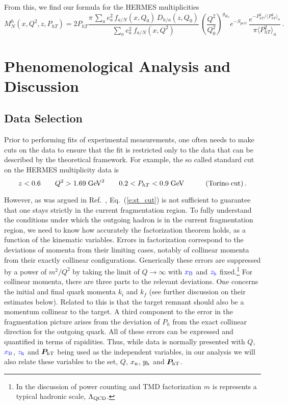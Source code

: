 \documentclass[final,3p,times,onecolumn,sort&compress,hidelinks]{elsarticle}
\newcommand{\xbj}{\ensuremath{{\cbl x_{\rm B}}}}
\newcommand{\xn}{\ensuremath{x_{\rm n}}}
\newcommand{\zh}{\ensuremath{{\cbl z_{\rm h}}}}
\newcommand{\hady}{\ensuremath{y_{\rm h}}}
\newcommand{\T}[2]{\boldsymbol{#1}_{#2\text{T}}}
\newcommand\3[1]{\boldsymbol{#1}}
\newcommand{\crd}{\color{red}}
\newcommand{\cbl}{\color{blue}}
\begin{document}
From this, we find our formula for the HERMES multiplicities~\cite{Airapetian:2012ki} 
\begin{equation}
M_N^h(x, Q^2,z, P_{hT}) =
2P_{hT}\frac{\pi\, \sum_{a} e_a^2 \,f_{a/N}(x, Q_0)\,D_{h/a}(z, Q_0)}
{\sum_{a} e_a^2 \> f_{a/N} (x,Q^2)} \,  \left( \frac{Q^2}{Q_0^2}\right)^{g_{K_0}}e^{-S_{pert}}\,
\frac{e^{-P_{hT}^2/\langle P_{hT}^2 \rangle_a}}{\pi\langle P_{hT}^2 \rangle_a}
\,. \label{e:mult_HERMES}
\end{equation}


\section{Phenomenological Analysis and Discussion}
\label{s:phenom}

\subsection{Data Selection}
\label{s:data}

Prior to performing  fits of  experimental measurements, one often needs to make cuts on the data to ensure that the fit is restricted only to the data that can be described by the theoretical  framework.  For example, the so called standard cut on the HERMES multiplicity data is~\cite{Anselmino:2013lza}
\begin{equation}
z < 0.6 \quad\quad Q^2 > 1.69 \; \textrm{GeV}^2  
\quad\quad 0.2 < P_{hT} < 0.9 \; \textrm{GeV} \quad\quad\quad{\rm (Torino\;cut)}\,.\label{e:st_cut}
\end{equation}

However, as was argued in Ref.~\cite{Boglione:2016bph}, Eq.~(\ref{e:st_cut}) is not sufficient to guarantee that one stays strictly in the current fragmentation region. To fully understand the conditions under which the outgoing hadron is in the current fragmentation region, we need to know how accurately the factorization theorem holds, as a function of the kinematic variables.
Errors in factorization correspond to the deviations of momenta
from their limiting cases, notably of collinear momenta from their
exactly collinear configurations.  Generically these errors are suppressed
by a power of $m^2/Q^2$ by taking the limit of $Q\rightarrow \infty$ with $\xbj$ and $\zh$ fixed.\footnote{In the discussion of power counting and TMD factorization $m$ is
  represents a typical hadronic scale, $\Lambda_{\rm QCD}$.}  For collinear momenta, there are
three parts to the relevant deviations.
One concerns the initial and final
quark momenta $k_i$ and $k_f$ (see further discussion on their estimates below).
 Related to this is that the target remnant should also be a momentum collinear to the target.   A third component to the error in the fragmentation picture arises from the deviation of $P_h$ from the exact collinear direction for the outgoing quark. All of these errors can be expressed and quantified  in terms of rapidities. {\crd Thus,  while data is normally presented with $Q$, $\xbj$, $\zh$ and $\T{P}{\rm h}$ being used as the independent variables, in our analysis we will also relate these variables to the set,
 $Q$, $\xn$, $\hady$ and $\T{P}{\rm h}$}.
\end{document}
